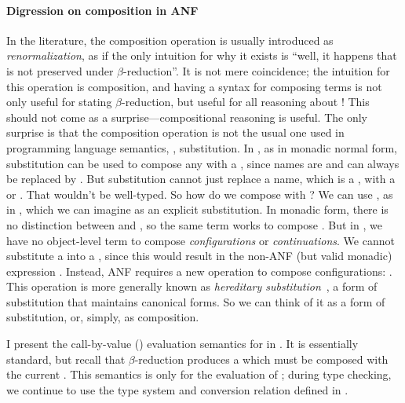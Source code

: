\paragraph{Digression on composition in ANF}
In the literature, the composition operation \im{\tK\hhw{\tM}} is usually
introduced as \emph{renormalization}, as if the only intuition for why it exists
is ``well, it happens that  is not preserved under \(\beta\)-reduction''.
It is not mere coincidence; the intuition for this operation is composition, and
having a syntax for composing terms is not only useful for stating
\(\beta\)-reduction, but useful for all reasoning about !
This should not come as a surprise---compositional reasoning is useful.
The only surprise is that the composition operation is not the usual
one used in programming language semantics, \ie, substitution.
In , as in monadic normal form, substitution can be used to compose
any  with a \emph{}, since names are
 and  can always be replaced by .
But substitution cannot just replace a name, which is a \emph{},
with a \emph{} or \emph{}.
That wouldn't be well-typed.
So how do we compose  with ?
We can use , as in \im{\tlete{\ty}{\tN}{\tM}}, which we can
imagine as an explicit substitution.
In monadic form, there is no distinction between  and
, so the same term works to compose .
But in , we have no object-level term to compose \emph{configurations}
or \emph{continuations}.
We cannot substitute a  \im{\tM} into a 
\im{\tlete{\ty}{\hole}{\tMpr}}, since this would result in the non-ANF (but
valid monadic) expression \im{\tlete{\ty}{\tM}{\tMpr}}.
Instead, ANF requires a new operation to compose configurations:
\im{\tK\hhw{\tM}}.
This operation is more generally known as \emph{hereditary
  substitution}~\cite{watkins2003:clf}, a form of substitution that maintains
canonical forms.
So we can think of it as a form of substitution, or, simply, as composition.

\FigECCARed
I present the call-by-value () evaluation semantics for \tlang in
.
It is essentially standard, but recall that \(\beta\)-reduction produces a
 \im{\tM} which must be composed with the
current  \im{\tK}.
This semantics is only for the evaluation of ;
during type checking, we continue to use the type system and conversion relation
defined in .

